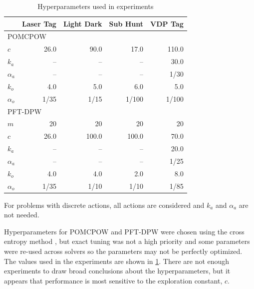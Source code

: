 \begin{table}[t]
    {\centering
\caption{Hyperparameters used in experiments} \label{tab:hyper}

\begin{center}
\begin{tabular}{lrrrr}
    \toprule
                & Laser Tag     & Light Dark    & Sub Hunt      & VDP Tag \\
    \midrule
    \multicolumn{3}{l}{POMCPOW} \\
    \midrule
    $c$         & \num{26.0}    & \num{90.0}    & \num{17.0}    & \num{110.0} \\
    $k_a$       & --            & --            & --            & \num{30.0}  \\
    $\alpha_a$  & --            & --            & --            & \num{1/30}  \\
    $k_o$       & \num{4.0}     & \num{5.0}     & \num{6.0}     & \num{5.0}   \\
    $\alpha_o$  & \num{1/35}    & \num{1/15}    & \num{1/100}   & \num{1/100} \\
    \midrule
    \multicolumn{3}{l}{PFT-DPW} \\
    \midrule
    $m$         & \num{20}      & \num{20}      & \num{20}      & \num{20}    \\
    $c$         & \num{26.0}    & \num{100.0}   & \num{100.0}   & \num{70.0}  \\
    $k_a$       & --            & --            & --            & \num{20.0}  \\
    $\alpha_a$  & --            & --            & --            & \num{1/25}  \\
    $k_o$       & \num{4.0}     & \num{4.0}     & \num{2.0}     & \num{8.0}   \\
    $\alpha_o$  & \num{1/35}    & \num{1/10}    & \num{1/10}    & \num{1/85}  \\
    \midrule

\end{tabular}
\end{center}
    }
    \vspace{1mm}

    \footnotesize{For problems with discrete actions, all actions are considered and $k_a$ and $\alpha_a$ are not needed.}
\end{table}

Hyperparameters for POMCPOW and PFT-DPW were chosen using the cross entropy method \cite{mannor2003cross}, but exact tuning was not a high priority and some parameters were re-used across solvers so the parameters may not be perfectly optimized.
The values used in the experiments are shown in \cref{tab:hyper}. 
There are not enough experiments to draw broad conclusions about the hyperparameters, but it appears that performance is most sensitive to the exploration constant, $c$.

